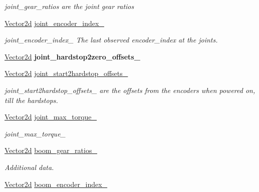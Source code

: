 \begin{DoxyCompactItemize}
\begin{DoxyCompactList}\small\item\em joint\+\_\+gear\+\_\+ratios are the joint gear ratios \end{DoxyCompactList}\item 
\hyperlink{common__header_8hpp_acb6916bc8c9fe9d98c484fd4cc201447}{Vector2d} \hyperlink{classblmc__robots_1_1Stuggihop_aabd468b6cbe31a5cba60fd8958da3d1a}{joint\+\_\+encoder\+\_\+index\+\_\+}\hypertarget{classblmc__robots_1_1Stuggihop_aabd468b6cbe31a5cba60fd8958da3d1a}{}\label{classblmc__robots_1_1Stuggihop_aabd468b6cbe31a5cba60fd8958da3d1a}

\begin{DoxyCompactList}\small\item\em joint\+\_\+encoder\+\_\+index\+\_\+ The last observed encoder\+\_\+index at the joints. \end{DoxyCompactList}\item 
\hyperlink{common__header_8hpp_acb6916bc8c9fe9d98c484fd4cc201447}{Vector2d} {\bfseries joint\+\_\+hardstop2zero\+\_\+offsets\+\_\+}\hypertarget{classblmc__robots_1_1Stuggihop_af724a5acb73f9e77db43bdeb2d91a42e}{}\label{classblmc__robots_1_1Stuggihop_af724a5acb73f9e77db43bdeb2d91a42e}

\item 
\hyperlink{common__header_8hpp_acb6916bc8c9fe9d98c484fd4cc201447}{Vector2d} \hyperlink{classblmc__robots_1_1Stuggihop_a63813a55789c75aa4e4c7d1c783c857d}{joint\+\_\+start2hardstop\+\_\+offsets\+\_\+}
\begin{DoxyCompactList}\small\item\em joint\+\_\+start2hardstop\+\_\+offsets\+\_\+ are the offsets from the encoders when powered on, till the hardstops. \end{DoxyCompactList}\item 
\hyperlink{common__header_8hpp_acb6916bc8c9fe9d98c484fd4cc201447}{Vector2d} \hyperlink{classblmc__robots_1_1Stuggihop_acd8110dd472072fb138d95964fefaa36}{joint\+\_\+max\+\_\+torque\+\_\+}\hypertarget{classblmc__robots_1_1Stuggihop_acd8110dd472072fb138d95964fefaa36}{}\label{classblmc__robots_1_1Stuggihop_acd8110dd472072fb138d95964fefaa36}

\begin{DoxyCompactList}\small\item\em joint\+\_\+max\+\_\+torque\+\_\+ \end{DoxyCompactList}\item 
\hyperlink{common__header_8hpp_acb6916bc8c9fe9d98c484fd4cc201447}{Vector2d} \hyperlink{classblmc__robots_1_1Stuggihop_a84f6ffe6ea3058bb908a4915e040e936}{boom\+\_\+gear\+\_\+ratios\+\_\+}
\begin{DoxyCompactList}\small\item\em Additional data. \end{DoxyCompactList}\item 
\hyperlink{common__header_8hpp_acb6916bc8c9fe9d98c484fd4cc201447}{Vector2d} \hyperlink{classblmc__robots_1_1Stuggihop_aacd3bb51e67331ec1e723a6f9a19a7b1}{boom\+\_\+encoder\+\_\+index\+\_\+}\hypertarget{classblmc__robots_1_1Stuggihop_aacd3bb51e67331ec1e723a6f9a19a7b1}{}\label{classblmc__robots_1_1Stuggihop_aacd3bb51e67331ec1e723a6f9a19a7b1}


\end{DoxyCompactItemize}
